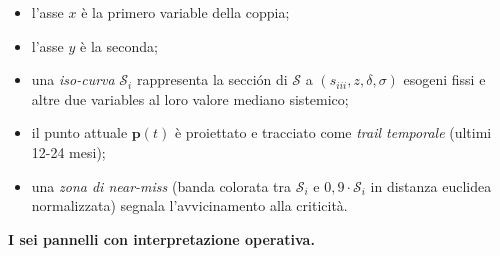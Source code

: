 \begin{itemize}
\tightlist
\item
  l'asse \(x\) è la primero variable della coppia;
\item
  l'asse \(y\) è la seconda;
\item
  una \emph{iso-curva} \(\mathcal{S}_i\) rappresenta la sección di
  \(\mathcal{S}\) a \((s_{iii}, z, \delta, \sigma)\) esogeni fissi e
  altre due variables al loro valore mediano sistemico;
\item
  il punto attuale \(\boldsymbol{p}(t)\) è proiettato e tracciato come
  \emph{trail temporale} (ultimi 12-24 mesi);
\item
  una \emph{zona di near-miss} (banda colorata tra \(\mathcal{S}_i\) e
  \(0{,}9 \cdot \mathcal{S}_i\) in distanza euclidea normalizzata)
  segnala l'avvicinamento alla criticità.
\end{itemize}

\Proved{} \textbf{I sei pannelli con interpretazione operativa.}

